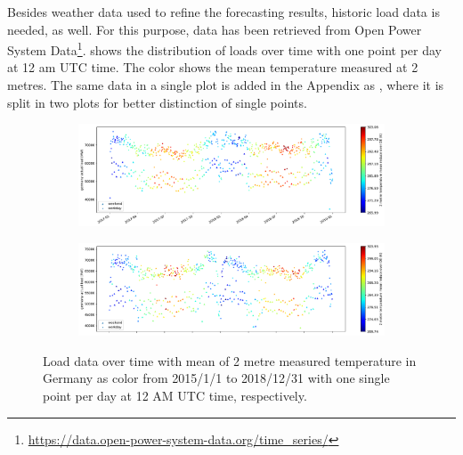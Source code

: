Besides weather data used to refine the forecasting results, historic load data is needed, as well. For this purpose, data has been retrieved from Open Power System Data\footnote{\url{https://data.open-power-system-data.org/time_series/}}.  shows the distribution of loads over time with one point per day at 12 am UTC time. The color shows the mean temperature measured at 2 metres. The same data in a single plot is added in the Appendix as , where it is split in two plots for better distinction of single points.\\


\begin{figure}[h!]%
	\centering
	\begin{subfigure}{.5\textwidth}
		\centering
		\includegraphics[width=2.9\textwidth,angle=-90,origin=c]{plots/plot_load_time_func/t2m_mean_18A5_2017010112_2018123112_24F}%
		\label{fig:t2m_mean_18A5_2017010112_2018123112_24F}%
	\end{subfigure}%
	\begin{subfigure}{.5\textwidth}
		\centering
		\includegraphics[width=2.9\textwidth,angle=-90,origin=c]{plots/plot_load_time_func/t2m_mean_18A5_2015010112_2016123112_24F}%
		\label{fig:t2m_mean_18A5_2015010112_2016123112_24F}%
	\end{subfigure}
	\caption{Load data over time with mean of 2 metre measured temperature in Germany as color from 2015/1/1 to 2018/12/31 with one single point per day at 12 AM UTC time, respectively.}
	\label{fig:t2m_mean_18A5_twofold_24F}
\end{figure}


